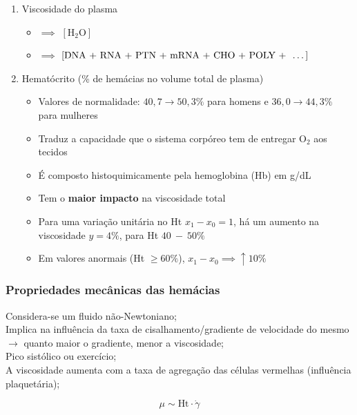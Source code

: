 \documentclass[a4paper,12pt]{article}
\begin{document}
\begin{enumerate}
    \item Viscosidade do plasma
    \begin{itemize}
        \item $\implies$ $\left[\text{H}_\mathrm{2}\text{O}\right]$
        \item $\implies$ $\left[\text{DNA + RNA + PTN + mRNA + CHO + POLY + \ \dots}\right]$
    \end{itemize}
    \item Hematócrito (\% de hemácias no volume total de plasma)
    \begin{itemize}
        \item Valores de normalidade: $40,7 \to 50,3 \%$ para homens e $36,0 \to 44,3 \%$ para mulheres
        \item Traduz a capacidade que o sistema corpóreo tem de entregar O$_2$ aos tecidos
        \item É composto histoquimicamente pela hemoglobina (Hb) em g/dL
        \item Tem o \textbf{maior impacto} na viscosidade total 
        \item Para uma variação unitária no Ht $x_1 - x_0 = 1$, há um aumento na viscosidade $y = 4 \%$, para Ht $40 \ - \ 50 \%$
        \item Em valores anormais (Ht $\ge 60 \%$), $x_1 - x_0 \implies \uparrow 10 \%$
    \end{itemize}
\end{enumerate}
\subsubsection*{Propriedades mecânicas das hemácias}

Considera-se um fluido não-Newtoniano; \\

Implica na influência da taxa de cisalhamento/gradiente de velocidade do mesmo $\longrightarrow$ quanto maior o gradiente, menor a viscosidade; \\

Pico sistólico ou exercício; \\

A viscosidade aumenta com a taxa de agregação das células vermelhas (influência plaquetária);

\newpage

\begin{equation}
    \mu \sim \text{Ht} \cdot \dot \gamma \nonumber
\end{equation}
\end{document}
